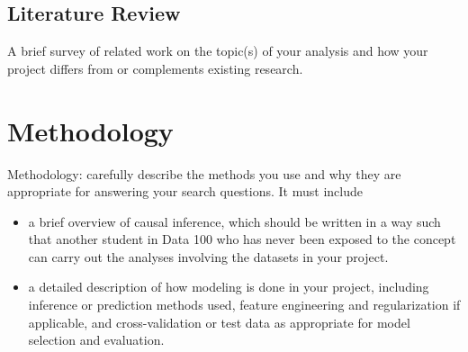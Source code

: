 \documentclass[11pt]{article}
\begin{document}
%
%
%
%
%
%
%
%
%
%
%
%
%
%

\subsection{Literature Review}
A brief survey of related work on the topic(s) of your analysis and how your project differs from or complements existing research.

\section{Methodology}

Methodology: carefully describe the methods you use and why they are appropriate for answering your search questions. It must include
\begin{itemize}
\item a brief overview of causal inference, which should be written in a way such that another student in Data 100 who has never been exposed to the concept can carry out the analyses involving the datasets in your project.
\item a detailed description of how modeling is done in your project, including inference or prediction methods used, feature engineering and regularization if applicable, and cross-validation or test data as appropriate for model selection and evaluation.
\end{itemize}
\end{document}
